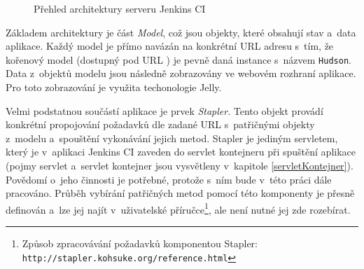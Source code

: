             \begin{figure}[ht]
                \begin{center}
                    \caption{Přehled architektury serveru Jenkins CI \cite{architectureOverview}}
                    \label{imgJenkinsArchitecture}
                \end{center}
            \end{figure}     

            Základem architektury je část \emph{Model}, což jsou objekty, které obsahují stav
            a~data aplikace. Každý model je přímo navázán na konkrétní URL adresu s~tím, že kořenový
            model (dostupný pod URL \uv{/}) je pevně daná instance s~názvem \texttt{Hudson}.
            Data z~objektů modelu jsou následně zobrazovány ve webovém rozhraní aplikace.
            Pro toto zobrazování je využita techonologie Jelly.

            Velmi podstatnou součástí aplikace je prvek \emph{Stapler}. Tento objekt
            provádí konkrétní propojování požadavků dle zadané URL s~patřičnými objekty
            z~modelu a~spouštění vykonávání jejich metod. Stapler je
            jediným servletem, který je v~aplikaci Jenkins CI zaveden do
            servlet kontejneru při spuštění aplikace (pojmy servlet a~servlet kontejner 
            jsou vysvětleny v~kapitole \ref{servletKontejner}).
            Povědomí o~jeho
            činnosti je potřebné, protože s~ním bude v~této práci dále pracováno.
            Průběh vybírání patřičných metod pomocí této komponenty je přesně
            definován a~lze jej najít v~uživatelské příručce\footnote{
                Způsob zpracovávání požadavků komponentou Stapler:
                \texttt{http://stapler.kohsuke.org/reference.html}}, 
                ale není nutné jej zde rozebírat.


